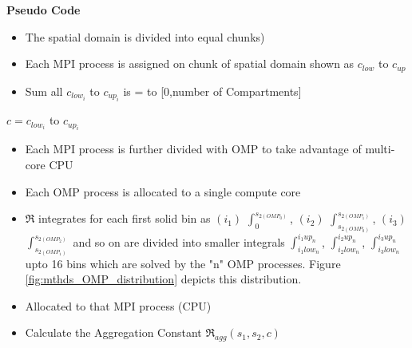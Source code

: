 \documentclass[preprint,11pt,authoryear]{elsarticle}
\begin{document}
\begin{algorithm}[!h]
\caption*{\textbf{Pseudo Code}}
\label{alg:MyAlgorithm}
\begin{algorithmic}[*]

\begin{itemize}[noitemsep,nolistsep,itemindent=10pt]
\item The spatial domain is divided into equal chunks)
\item Each MPI process is assigned on chunk of spatial domain shown as $c_{low}$ to $c_{up}$ 
\item Sum all $c_{low_i}$ to $c_{up_i}$ is = to [0,number of Compartments]
\end{itemize}
 $c = c_{low_i}$ to $c_{up_i}$
\begin{itemize}[noitemsep,nolistsep,itemindent=20pt]
\item Each MPI process is further divided with OMP to take advantage of multi-core CPU
\item Each OMP process is allocated to a single compute core
\item $\Re$ integrates for each first solid bin as $(i_1)$ $\int_{0}^{s_{2(OMP_0)}}$, $(i_2)$ $\int_{s_{2(OMP_0)}}^{s_{2(OMP_1)}}$, $(i_3)$ 
$\int_{s_{2(OMP_1)}}^{s_{2(OMP_2)}}$   and so on are divided into smaller integrals  $\int_{i_1low_n}^{i_1up_n}$, $\int_{i_2low_n}
^{i_2up_n}$, $\int_{i_3low_n}^{i_3up_n}$ upto 16 bins 
which are solved by the "n" OMP processes. Figure \ref{fig:mthds_OMP_distribution} depicts this distribution.
\item Allocated to that MPI process (CPU)
\end{itemize}
\begin{itemize}[noitemsep,nolistsep,itemindent=30pt]
\item Calculate the Aggregation Constant $\Re_{agg}(s_1,s_2,c)$
\end{itemize}

\end{algorithmic}
\end{algorithm}
\end{document}
